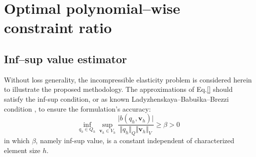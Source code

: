 \section{Optimal polynomial--wise constraint ratio}
\subsection{Inf--sup value estimator}

Without loss generality, the incompressible elasticity problem is considered herein to illustrate the proposed methodology.
The approximations of Eq.\eqref{} should satisfy the inf-sup condition, or as known Ladyzhenskaya–Babuška–Brezzi condition \cite{bathe1996}, to ensure the formulation's accuracy:
\begin{equation}\label{infsup}
    \inf_{q_h \in Q_h} \sup_{\boldsymbol v_h \in V_h} \frac{\vert b(q_h,\boldsymbol v_h) \vert}{\Vert q_h \Vert_Q \Vert \boldsymbol v_h \Vert_V} \ge \beta > 0
\end{equation}
in which $\beta$, namely inf-sup value, is a constant independent of characterized element size $h$.

